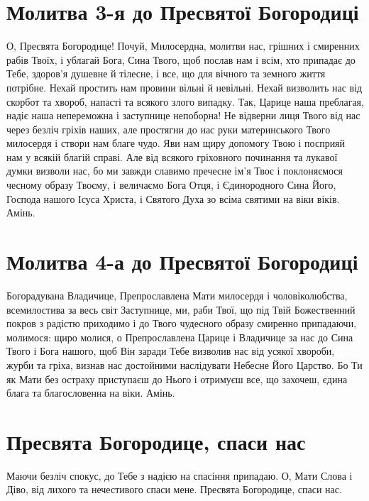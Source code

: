 \documentclass[chapters.tex]{subfiles}
\begin{document}
\section{Молитва 3-я до Пресвятої Богородиці}
О, Пресвята Богородице! Почуй, Милосердна, молитви нас, грішних і смиренних рабів Твоїх, і ублагай Бога, Сина Твого, щоб послав нам і всім, хто припадає до Тебе, здоров’я душевне й тілесне, і все, що для вічного та земного життя потрібне. Нехай простить нам провини вільні й невільні. Нехай визволить нас від скорбот та хвороб, напасті та всякого злого випадку. Так, Царице наша преблагая, надіє наша непереможна і заступнице непоборна! Не відверни лиця Твого від нас через безліч гріхів наших, але простягни до нас руки материнського Твого милосердя і створи нам благе чудо. Яви нам щиру допомогу Твою і посприяй нам у всякій благій справі. Але від всякого гріховного починання та лукавої думки визволи нас, бо ми завжди славимо пречесне ім’я Твоє і поклоняємося чесному образу Твоєму, і величаємо Бога Отця, і Єдинородного Сина Його, Господа нашого Ісуса Христа, і Святого Духа зо всіма святими на віки віків. Амінь.

\section{Молитва 4-а до Пресвятої Богородиці}
Богорадувана Владичице, Препрославлена Мати милосердя і чоловіколюбства, всемилостива за весь світ Заступнице, ми, раби Твої, що під Твій Божественний покров з радістю приходимо і до Твого чудесного образу смиренно припадаючи, молимося: щиро молися, о Препрославлена Царице і Владичице за нас до Сина Твого і Бога нашого, щоб Він заради Тебе визволив нас від усякої хвороби, журби та гріха, визнав нас достойними наслідувати Небесне Його Царство. Бо Ти як Мати без остраху приступаєш до Нього і отримуєш все, що захочеш, єдина блага та благословенна на віки. Амінь.

\section{Пресвята Богородице, спаси нас}
Маючи безліч спокус, до Тебе з надією на спасіння припадаю. О, Мати Слова і Діво, від лихого та нечестивого спаси мене. Пресвята Богородице, спаси нас.
\end{document}
